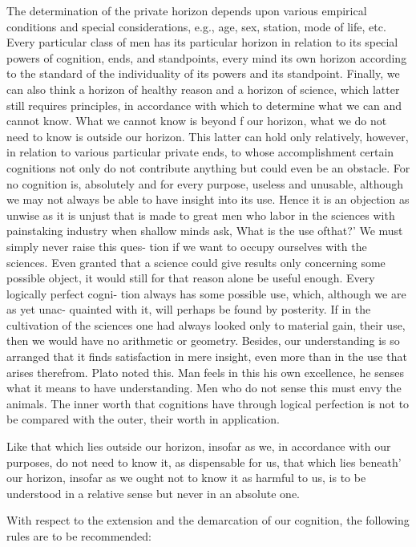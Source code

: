 The determination of the private horizon depends upon various
empirical conditions and special considerations,
e.g., age, sex, station, mode of life, etc.
Every particular class of men has its particular horizon in relation
to its special powers of cognition, ends, and standpoints, every mind its
own horizon according to the standard of the individuality of its powers
and its standpoint. Finally, we can also think a horizon of healthy reason
and a horizon of science, which latter still requires principles, in accordance
with which to determine what we can and cannot know.
What we cannot know is beyond f our horizon, what we do not need to
know is outside our horizon. This latter can hold only relatively, however,
in relation to various particular private ends, to whose accomplishment
certain cognitions not only do not contribute anything but could even be
an obstacle. For no cognition is, absolutely and for every purpose, useless
and unusable, although we may not always be able to have insight into its
use. Hence it is an objection as unwise as it is unjust that is made to great
men who labor in the sciences with painstaking industry when shallow
minds ask, What is the use ofthat?' We must simply never raise this ques-
tion if we want to occupy ourselves with the sciences. Even granted that a
science could give results only concerning some possible object, it would
still for that reason alone be useful enough. Every logically perfect cogni-
tion always has some possible use, which, although we are as yet unac-
quainted with it, will perhaps be found by posterity. If in the cultivation of
the sciences one had always looked only to material gain, their use, then
we would have no arithmetic or geometry. Besides, our understanding is
so arranged that it finds satisfaction in mere insight, even more than in the
use that arises therefrom. Plato noted this. Man feels in this his own
excellence, he senses what it means to have understanding. Men who do
not sense this must envy the animals. The inner worth that cognitions have
through logical perfection is not to be compared with the outer, their worth
in application.

Like that which lies outside our horizon, insofar as we, in accordance
with our purposes, do not need to know it, as dispensable for us, that which
lies beneath' our horizon, insofar as we ought not to know it as harmful to
us, is to be understood in a relative sense but never in an absolute one.

With respect to the extension and the demarcation of our cognition,
the following rules are to be recommended:

